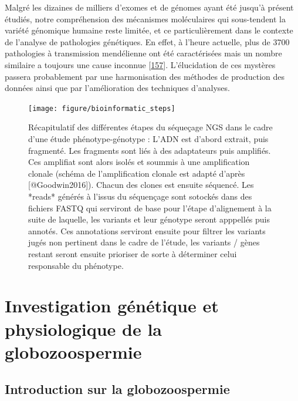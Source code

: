 \documentclass[12pt,twoside]{reedthesis}
\theoremstyle{definition}
\theoremstyle{definition}
\theoremstyle{remark}
\begin{document}
  Malgré les dizaines de milliers d'exomes et de génomes ayant été jusqu'à
  présent étudiés, notre compréhension des mécanismes moléculaires qui
  sous-tendent la variété génomique humaine reste limitée, et ce
  particulièrement dans le contexte de l'analyse de pathologies
  génétiques. En effet, à l'heure actuelle, plus de 3700 pathologies à
  transmission mendélienne ont été caractérisées mais un nombre similaire
  a toujours une cause inconnue
  {[}\protect\hyperlink{ref-Amberger2011}{157}{]}. L'élucidation de ces
  mystères passera probablement par une harmonisation des méthodes de
  production des données ainsi que par l'amélioration des techniques
  d'analyses.
  
  \newpage 
  
  \begin{figure}
  
  {\centering \texttt{[image: figure/bioinformatic\_steps]} 
  
  }
  
  \caption[Récapitulatif des différentes étapes du séqueçage NGS dans le cadre d'une étude phénotype-génotype]{Récapitulatif des différentes étapes du séqueçage NGS dans le cadre d'une étude phénotype-génotype : L'ADN est d'abord extrait, puis fragmenté. Les fragments sont liés à des adaptateurs puis amplifiés. Ces amplifiat sont alors isolés et soummis à une amplification clonale (schéma de l'amplification clonale est adapté d'après [@Goodwin2016]). Chacun des clones est ensuite séquencé. Les *reads* générés à l'issus du séquençage sont sotockés dans des fichiers FASTQ qui serviront de base pour l'étape d'alignement à la suite de laquelle, les variants et leur génotype seront apppellés puis annotés. Ces annotations serviront ensuite pour filtrer les variants jugés non pertinent dans le cadre de l'étude, les variants / gènes restant seront ensuite prioriser de sorte à déterminer celui responsable du phénotype.}\label{fig:pictrecapngssteps}
  \end{figure}
  
  \hypertarget{globo}{\chapter{Investigation génétique et physiologique de
  la globozoospermie}\label{globo}}
  
  \section{Introduction sur la
  globozoospermie}\label{introduction-sur-la-globozoospermie}
  
\end{document}
